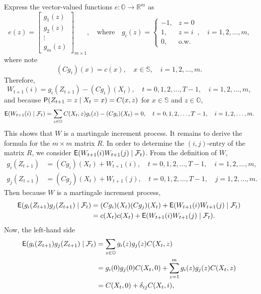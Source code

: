 \documentclass[twoside,11pt]{article}
\def\Re{\mathbb{R}}
\newcommand{\field}[1]{\mathbb{#1}}
\def\Re{\field{R}}
\def\E{{\sf E}}
\def\bS{\begin{slide}}
\def\Re{\mathbb{R}}
\def\E{{\sf E}}
\renewcommand{\Re}{\mathbb{R}}
\def\clF{{\cal F}}
\def\E{{\sf E}}
\def\bS{\mathbb{S}}
\def\bO{\mathbb{O}}
\def\sP{{\sf P}}
\begin{document}
Express the vector-valued functions $e:\bO\to\Re^m$ as
\begin{equation*}
e(z) = \begin{bmatrix} g_1(z) \\ g_2(z) \\ \vdots \\
  g_m(z) \end{bmatrix}_{m\times 1},\quad \text{where}\quad g_i(z)
= \begin{cases} -1, & z=0 \\ 1, & z=i \\ 0, & \text{o.w.}\end{cases},
\quad i=1,2,\hdots,m,
\end{equation*}
where note
\begin{equation*}
(C g_i)(x) = c(x),\quad x\in\bS,\quad i=1,2,\hdots, m.
\end{equation*}
Therefore,
\begin{equation*}
W_{t+1}(i) = g_i(Z_{t+1}) - (Cg_i)(X_t),\quad t=0,1,2,\hdots,T-1,\quad i=1,2,\hdots, m,
\end{equation*}
and because $\sP(Z_{t+1}=z \mid X_t=x) = C(x,z)$ for $x\in\bS$ and $z\in\bO$,
\begin{equation*}
\E (W_{t+1}(i) \mid \clF_t) = \sum_{z\in \bO} C(X_t,z) g_i(z) -
(Cg_i)(X_t) = 0, \quad t=0,1,2,\hdots,T-1,\quad i=1,2,\hdots, m.
\end{equation*}
This shows that $W$ is a martingale increment process.  It remains to
derive the formula for the $m\times m$ matrix $R$.  In order to
determine the $(i,j)$-entry of the matrix $R$, we consider
$\E(W_{t+1}(i) W_{t+1}(j) \mid \clF_t)$.  From the definition of $W$, 
\begin{align*}
  g_i(Z_{t+1}) &= (Cg_i)(X_t) + W_{t+1}(i) ,\quad
  t=0,1,2,\hdots,T-1,\quad i=1,2,\hdots, m, \\
  g_j(Z_{t+1}) &= (Cg_j)(X_t) + W_{t+1}(j) ,\quad t=0,1,2,\hdots,T-1,\quad j=1,2,\hdots, m.
\end{align*}
Then because $W$ is a martingale increment process,
\begin{align*}
\E (g_i(Z_{t+1})  g_j(Z_{t+1}) \mid \clF_t) & = (Cg_i)(X_t) (Cg_j)(X_t)
                                              + \E(W_{t+1}(i) W_{t+1}(j) \mid \clF_t)\\
  & = c(X_t) c(X_t)
  + \E(W_{t+1}(i) W_{t+1}(j) \mid \clF_t).
\end{align*}
Now, the left-hand side
\begin{align*}
  \E (g_i(Z_{t+1})  g_j(Z_{t+1}) \mid \clF_t) & = \sum_{z \in \bO}
                                                g_i(z) g_j(z)
                                                C(X_t,z) \\
  & = g_i(0)g_j(0) C(X_t,0)+\sum_{z =1}^m
                                                g_i(z) g_j(z)
                                                C(X_t,z) \\
  & = C(X_t,0) + \delta_{ij} C(X_t,i),
\end{align*}
\end{document}
